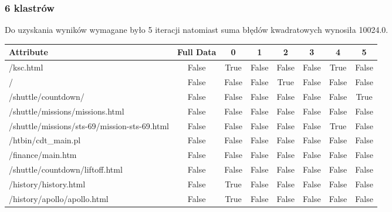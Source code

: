 \documentclass[../EDI_Task1_Karwowski_Kowalewski.tex]{subfiles}
\begin{document}
{{        \subsubsection{6 klastrów} {

            Do uzyskania wyników wymagane było 5 iteracji natomiast suma błędów
            kwadratowych wynosiła 10024.0.
            \begin{table}[!htbp]
                \footnotesize
                \centering
                \begin{tabular}{|l|c|c|c|c|c|c|c|}
                    \hline
                    Attribute                                        &  Full Data   &       0   &       1   &       2   &       3   &       4   &       5 \\ \hline
                    /ksc.html                                        &      False   &    True   &   False   &   False   &   False   &    True   &   False \\
                    /                                                &      False   &   False   &   False   &    True   &   False   &   False   &   False \\
                    /shuttle/countdown/                              &      False   &   False   &   False   &   False   &   False   &   False   &    True \\
                    /shuttle/missions/missions.html                  &      False   &   False   &   False   &   False   &   False   &   False   &   False \\
                    /shuttle/missions/sts-69/mission-sts-69.html     &      False   &   False   &   False   &   False   &   False   &    True   &   False \\
                    /htbin/cdt\_main.pl                               &      False   &   False   &   False   &   False   &   False   &   False   &   False \\
                    /finance/main.htm                                &      False   &   False   &   False   &   False   &   False   &   False   &   False \\
                    /shuttle/countdown/liftoff.html                  &      False   &   False   &   False   &   False   &   False   &   False   &   False \\
                    /history/history.html                            &      False   &    True   &   False   &   False   &   False   &   False   &   False \\
                    /history/apollo/apollo.html                      &      False   &    True   &   False   &   False   &   False   &   False   &   False \\

\end{tabular}
\end{table}}}}
\end{document}

